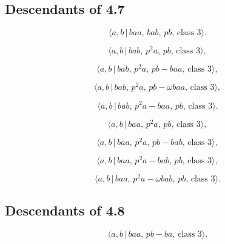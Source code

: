 \documentclass[10pt]{article}
\begin{document}
\subsection{Descendants of 4.7}

\begin{equation}
\langle a,b\,|\,baa,\,bab,\,pb,\,\text{class }3\rangle .  \tag{5.49}
\end{equation}

\begin{equation}
\langle a,b\,|\,bab,\,p^{2}a,\,pb,\,\text{class }3\rangle ,  \tag{5.50}
\end{equation}

\begin{equation}
\langle a,b\,|\,bab,\,p^{2}a,\,pb-baa,\,\text{class }3\rangle ,  \tag{5.51}
\end{equation}

\begin{equation}
\langle a,b\,|\,bab,\,p^{2}a,\,pb-\omega baa,\,\text{class }3\rangle , 
\tag{5.52}
\end{equation}

\begin{equation}
\langle a,b\,|\,bab,\,p^{2}a-baa,\,pb,\,\text{class }3\rangle .  \tag{5.53}
\end{equation}

\begin{equation}
\langle a,b\,|\,baa,\,p^{2}a,\,pb,\,\text{class }3\rangle ,  \tag{5.54}
\end{equation}

\begin{equation}
\langle a,b\,|\,baa,\,p^{2}a,\,pb-bab,\,\text{class }3\rangle ,  \tag{5.55}
\end{equation}

\begin{equation}
\langle a,b\,|\,baa,\,p^{2}a-bab,\,pb,\,\text{class }3\rangle ,  \tag{5.56}
\end{equation}

\begin{equation}
\langle a,b\,|\,baa,\,p^{2}a-\omega bab,\,pb,\,\text{class }3\rangle . 
\tag{5.57}
\end{equation}

\subsection{Descendants of 4.8}

\begin{equation}
\langle a,b\,|\,baa,\,pb-ba,\,\text{class }3\rangle .  \tag{5.58}
\end{equation}
\end{document}
